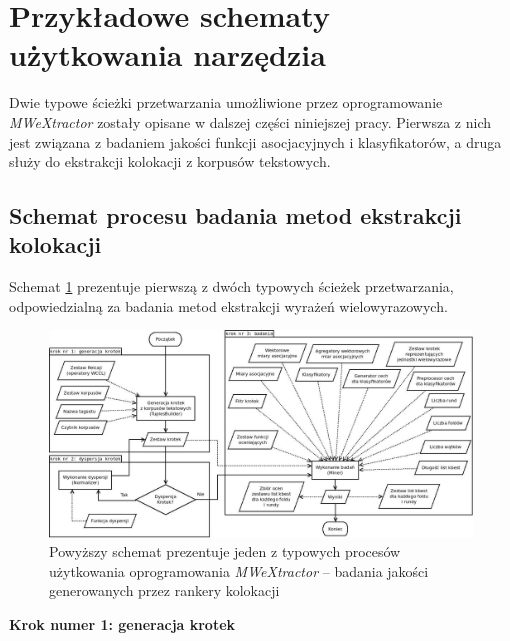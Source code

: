 \documentclass[11pt,a4paper]{llncs}
\begin{document}
\section{Przykładowe schematy użytkowania narzędzia}\label{s3}
Dwie typowe ścieżki przetwarzania umożliwione przez oprogramowanie \emph{MWeXtractor} zostały opisane w dalszej części niniejszej pracy.
Pierwsza z nich jest związana z badaniem jakości funkcji asocjacyjnych i klasyfikatorów, a druga służy do ekstrakcji kolokacji z korpusów tekstowych.

\subsection{Schemat procesu badania metod ekstrakcji kolokacji}
Schemat \ref{user_processing_scheme_research} prezentuje pierwszą z dwóch typowych ścieżek przetwarzania, odpowiedzialną za badania metod ekstrakcji wyrażeń wielowyrazowych.

\begin{figure}[h!]
\centering
\includegraphics[width=\textwidth]{charts/user_processing_scheme_research.jpg}
\caption [Przykładowy schemat procesu badania jakości rankerów]{Powyższy schemat prezentuje jeden z typowych procesów użytkowania oprogramowania \emph{MWeXtractor} -- badania jakości generowanych przez rankery kolokacji}
\label{user_processing_scheme_research}
\end{figure}


\noindent\textbf{Krok numer 1: generacja krotek}
\end{document}
